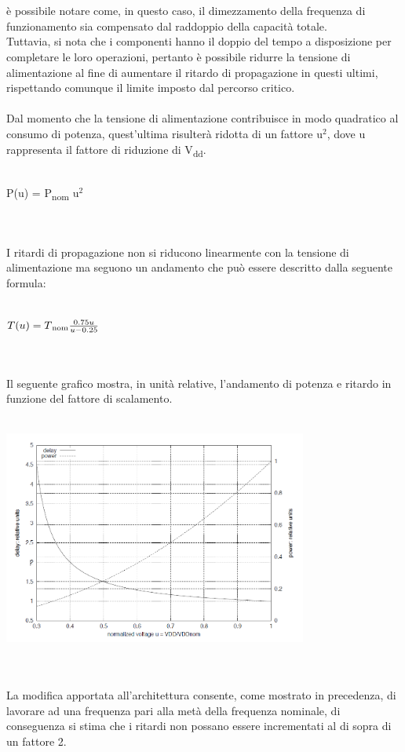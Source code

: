 \documentclass[11pt,  english, makeidx, a4paper, titlepage, oneside]{book}
\begin{document}
\\\\
è possibile notare come, in questo caso, il dimezzamento della frequenza di funzionamento sia compensato dal raddoppio della capacità totale.
\\
Tuttavia, si nota che i componenti hanno il doppio del tempo a disposizione per completare le loro operazioni, pertanto è possibile ridurre la tensione di alimentazione al fine di aumentare il ritardo di propagazione in questi ultimi, rispettando comunque il limite imposto dal percorso critico.
\\\\
Dal momento che la tensione di alimentazione contribuisce in modo quadratico al consumo di potenza, quest'ultima risulterà ridotta di un fattore u$^2$, dove u rappresenta il fattore di riduzione di V\textsubscript{dd}.
\\\\
\centerline{P(u) = P\textsubscript{nom} u$^2$}
\\\\
I ritardi di propagazione non si riducono linearmente con la tensione di alimentazione ma seguono un andamento che può essere descritto dalla seguente formula:
\\\\
\centerline{$T(u) = T\textsubscript{nom} \frac{0.75u}{u-0.25}$}
\\\\
Il seguente grafico mostra, in unità relative, l'andamento di potenza e ritardo in funzione del fattore di scalamento.
\\\\
\centerline{\includegraphics[width=10cm]{./img/Lab_3/grafico_u.png}}
\\\\
La modifica apportata all'architettura consente, come mostrato in precedenza, di lavorare ad una frequenza pari alla metà della frequenza nominale, di conseguenza si stima che i ritardi non possano essere incrementati al di sopra di un fattore 2.
\end{document}
